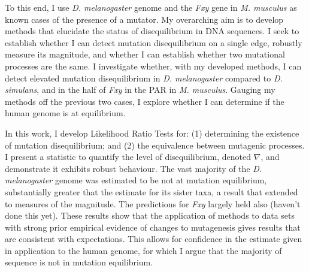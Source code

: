 To this end, I use \textit{D. melanogaster} genome and the \textit{Fxy} gene in \textit{M. musculus} as known cases of the presence of a mutator. My overarching aim is to develop methods that elucidate the status of disequilibrium in DNA sequences. I seek to establish whether I can detect mutation disequilibrium on a single edge, robustly measure its magnitude, and whether I can establish whether two mutational processes are the same. I investigate whether, with my developed methods, I can detect elevated mutation disequilibrium in \textit{D. melanogaster} compared to \textit{D. simulans}, and in the half of \textit{Fxy} in the PAR in \textit{M. musculus}. Gauging my methods off the previous two cases, I explore whether I can determine if the human genome is at equilibrium. 

In this work, I develop Likelihood Ratio Tests for: (1) determining the existence of mutation disequilibrium; and (2) the equivalence between mutagenic processes. I present a statistic to quantify the level of disequilibrium, denoted $\nabla$, and demonstrate it exhibits robust behaviour. The vast majority of the \textit{D. melanogaster} genome was estimated to be not at mutation equilibrium, substantially greater that the estimate for its sister taxa, a result that extended to measures of the magnitude. The predictions for \textit{Fxy} largely held also (haven't done this yet). These results show that the application of methods to data sets with strong prior empirical evidence of changes to mutagenesis gives results that are consistent with expectations. This allows for confidence in the estimate given in application to the human genome, for which I argue that the majority of sequence is not in mutation equilibrium. 